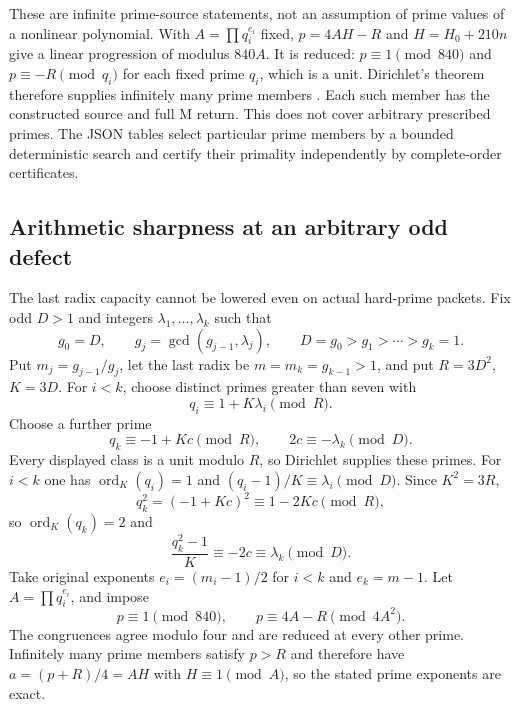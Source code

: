 These are infinite prime-source statements, not an assumption of prime values
of a nonlinear polynomial. With $A=\prod q_i^{e_i}$ fixed, $p=4AH-R$ and
$H=H_0+210n$ give a linear progression of modulus $840A$. It is reduced:
$p\equiv1\pmod{840}$ and $p\equiv-R\pmod{q_i}$ for each fixed prime $q_i$,
which is a unit. Dirichlet's theorem therefore supplies infinitely many prime
members \citep[Theorem~18.1]{Dirichlet}. Each such member has the constructed
source and full M return. This does not cover arbitrary prescribed primes.
The JSON tables select particular prime members by a bounded deterministic
search and certify their primality independently by complete-order certificates.

\subsection{Arithmetic sharpness at an arbitrary odd defect}
The last radix capacity cannot be lowered even on actual hard-prime packets.
Fix odd $D>1$ and integers $\lambda_1,\ldots,\lambda_k$ such that
\[
 g_0=D,\qquad g_j=\gcd(g_{j-1},\lambda_j),\qquad
 D=g_0>g_1>\cdots>g_k=1.
\]
Put $m_j=g_{j-1}/g_j$, let the last radix be
$m=m_k=g_{k-1}>1$, and put $R=3D^2$, $K=3D$. For $i<k$, choose distinct primes greater
than seven with
\[
 q_i\equiv1+K\lambda_i\pmod R.
\]
Choose a further prime
\[
 q_k\equiv-1+Kc\pmod R,\qquad 2c\equiv-\lambda_k\pmod D.
\]
Every displayed class is a unit modulo $R$, so Dirichlet supplies these primes.
For $i<k$ one has $\operatorname{ord}_K(q_i)=1$ and
$(q_i-1)/K\equiv\lambda_i\pmod D$. Since $K^2=3R$,
\[
 q_k^2=(-1+Kc)^2\equiv1-2Kc\pmod R,
\]
so $\operatorname{ord}_K(q_k)=2$ and
\[
 \frac{q_k^2-1}{K}\equiv-2c\equiv\lambda_k\pmod D.
\]
Take original exponents $e_i=(m_i-1)/2$ for $i<k$ and $e_k=m-1$. Let
$A=\prod q_i^{e_i}$, and impose
\[
 p\equiv1\pmod{840},\qquad p\equiv4A-R\pmod{4A^2}.
\]
The congruences agree modulo four and are reduced at every other prime.
Infinitely many prime members satisfy $p>R$ and therefore have
$a=(p+R)/4=AH$ with
$H\equiv1\pmod A$, so the stated prime exponents are exact.

